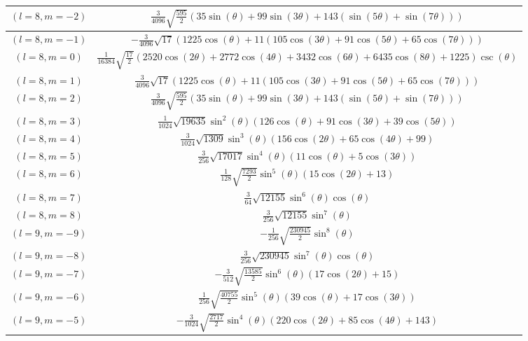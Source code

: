 \begin{center}
\begin{longtable}{|c|c|}
$(l=8, m=-2)$ & $\frac{3}{4096} \sqrt{\frac{595}{2}} (35 \sin (\theta )+99 \sin (3 \theta )+143 (\sin (5 \theta )+\sin (7 \theta )))$ \\ \hline
\rowcolor{gray!15}
$(l=8, m=-1)$ & $-\frac{3}{4096} \sqrt{17} (1225 \cos (\theta )+11 (105 \cos (3 \theta )+91 \cos (5 \theta )+65 \cos (7 \theta )))$ \\ \hline
$(l=8, m=0)$ & $\frac{1}{16384} \sqrt{\frac{17}{2}} (2520 \cos (2 \theta )+2772 \cos (4 \theta )+3432 \cos (6 \theta )+6435 \cos (8 \theta )+1225) \csc (\theta )$ \\ \hline
\rowcolor{gray!15}
$(l=8, m=1)$ & $\frac{3}{4096} \sqrt{17} (1225 \cos (\theta )+11 (105 \cos (3 \theta )+91 \cos (5 \theta )+65 \cos (7 \theta )))$ \\ \hline
$(l=8, m=2)$ & $\frac{3}{4096} \sqrt{\frac{595}{2}} (35 \sin (\theta )+99 \sin (3 \theta )+143 (\sin (5 \theta )+\sin (7 \theta )))$ \\ \hline
\rowcolor{gray!15}
$(l=8, m=3)$ & $\frac{1}{1024} \sqrt{19635} \sin ^2(\theta ) (126 \cos (\theta )+91 \cos (3 \theta )+39 \cos (5 \theta ))$ \\ \hline
$(l=8, m=4)$ & $\frac{3}{1024} \sqrt{1309} \sin ^3(\theta ) (156 \cos (2 \theta )+65 \cos (4 \theta )+99)$ \\ \hline
\rowcolor{gray!15}
$(l=8, m=5)$ & $\frac{3}{256} \sqrt{17017} \sin ^4(\theta ) (11 \cos (\theta )+5 \cos (3 \theta ))$ \\ \hline
$(l=8, m=6)$ & $\frac{1}{128} \sqrt{\frac{7293}{2}} \sin ^5(\theta ) (15 \cos (2 \theta )+13)$ \\ \hline
\rowcolor{gray!15}
$(l=8, m=7)$ & $\frac{3}{64} \sqrt{12155} \sin ^6(\theta ) \cos (\theta )$ \\ \hline
$(l=8, m=8)$ & $\frac{3}{256} \sqrt{12155} \sin ^7(\theta )$ \\ \hline
\rowcolor{gray!15}
$(l=9, m=-9)$ & $-\frac{1}{256} \sqrt{\frac{230945}{2}} \sin ^8(\theta )$ \\ \hline
$(l=9, m=-8)$ & $\frac{3}{256} \sqrt{230945} \sin ^7(\theta ) \cos (\theta )$ \\ \hline
\rowcolor{gray!15}
$(l=9, m=-7)$ & $-\frac{3}{512} \sqrt{\frac{13585}{2}} \sin ^6(\theta ) (17 \cos (2 \theta )+15)$ \\ \hline
$(l=9, m=-6)$ & $\frac{1}{256} \sqrt{\frac{40755}{2}} \sin ^5(\theta ) (39 \cos (\theta )+17 \cos (3 \theta ))$ \\ \hline
\rowcolor{gray!15}
$(l=9, m=-5)$ & $-\frac{3}{1024} \sqrt{\frac{2717}{2}} \sin ^4(\theta ) (220 \cos (2 \theta )+85 \cos (4 \theta )+143)$ \\ \hline

\end{longtable}
\end{center}
